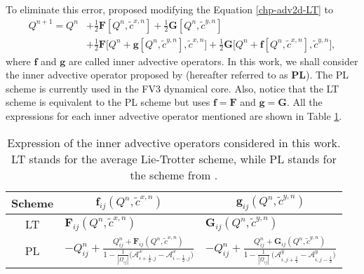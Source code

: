 To eliminate this error, \citet{lin:1996} proposed modifying the Equation \eqref{chp-adv2d-LT} to
\begin{align}
\label{chp-adv2d-PL}
Q^{n+1} = Q^n &+ \frac{1}{2}\mathbf{F}[Q^n,\tilde{c}^{x,n}] + \frac{1}{2}\mathbf{G}[Q^n,\tilde{c}^{y,n}]\nonumber \\
&+\frac{1}{2}\mathbf{F}\bigg[Q^n + \mathbf{g}[Q^n, \tilde{c}^{y,n}], \tilde{c}^{x,n}\bigg]+
\frac{1}{2}\mathbf{G}\bigg[Q^n + \mathbf{f}[Q^n, \tilde{c}^{x,n}], \tilde{c}^{y,n}\bigg],
\end{align}
where $\mathbf{f}$ and $\mathbf{g}$ are called inner advective operators.
In this work, we shall consider the inner advective operator proposed by \citet{putman:2007} (hereafter referred to as \textbf{PL}).
The PL scheme is currently used in the FV3 dynamical core. Also, notice that the LT scheme is equivalent to the PL scheme but uses 
$\mathbf{f}=\mathbf{F}$ and $\mathbf{g}=\mathbf{G}$.
All the expressions for each inner advective operator mentioned are shown in Table \ref{chp-adv2d-tab1}.
\begin{table}[!h]
	\begin{tabular}{|c|l|l|}
		\hline
		Scheme & \multicolumn{1}{c|}{$\mathbf{f}_{ij}(Q^n, \tilde{c}^{x,n})$}
		       & \multicolumn{1}{c|}{$\mathbf{g}_{ij}(Q^n, \tilde{c}^{y,n})$} \\ \hline
		LT   & $\mathbf{F}_{ij}(Q^n,\tilde{c}^{x,n})$ 
		       & $\mathbf{G}_{ij}(Q^n,\tilde{c}^{y,n})$ \\ \hline
		PL   & $-Q_{ij}^n +
		         \frac{Q_{ij}^n  + \mathbf{F}_{ij}(Q^n,\tilde{c}^{x,n})}
			   {1 - \frac{1}{|\Omega_{ij}|}\big(\mathcal{A}_{i+\frac{1}{2},j}^{x} - \mathcal{A}_{i-\frac{1}{2},j}^{x}\big)}$
			   & $-Q_{ij}^n +
			 \frac{Q_{ij}^n  + \mathbf{G}_{ij}(Q^n,\tilde{c}^{y,n})}
			   {1 - \frac{1}{|\Omega_{ij}|}\ \big(\mathcal{A}_{i,j+\frac{1}{2}}^{y} - \mathcal{A}_{i,j-\frac{1}{2}}^{y}\big)}$
			   \\ \hline
	\end{tabular}
\caption{Expression of the inner advective operators considered in this work.
LT stands for the average Lie-Trotter  scheme, while PL stands for the scheme from \citet{putman:2007}.}
\label{chp-adv2d-tab1}
\end{table}

